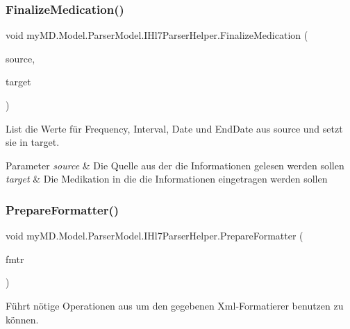 \subsubsection{\texorpdfstring{Finalize\+Medication()}{FinalizeMedication()}}
{\footnotesize\ttfamily void my\+M\+D.\+Model.\+Parser\+Model.\+I\+Hl7\+Parser\+Helper.\+Finalize\+Medication (\begin{DoxyParamCaption}\item[{Substance\+Administration}]{source,  }\item[{\mbox{\hyperlink{classmy_m_d_1_1_model_1_1_data_model_1_1_medication}{Medication}}}]{target }\end{DoxyParamCaption})}



List die Werte für Frequency, Interval, Date und End\+Date aus source und setzt sie in target. 


\begin{DoxyParams}{Parameter}
{\em source} & Die Quelle aus der die Informationen gelesen werden sollen\\
\hline
{\em target} & Die Medikation in die die Informationen eingetragen werden sollen\\
\hline
\end{DoxyParams}
\mbox{\label{interfacemy_m_d_1_1_model_1_1_parser_model_1_1_i_hl7_parser_helper_ab4114a84678d1b0ce5df7fdc00119dc4}} 
\subsubsection{\texorpdfstring{Prepare\+Formatter()}{PrepareFormatter()}}
{\footnotesize\ttfamily void my\+M\+D.\+Model.\+Parser\+Model.\+I\+Hl7\+Parser\+Helper.\+Prepare\+Formatter (\begin{DoxyParamCaption}\item[{Xml\+Its1\+Formatter}]{fmtr }\end{DoxyParamCaption})}



Führt nötige Operationen aus um den gegebenen Xml-\/\+Formatierer benutzen zu können. 


